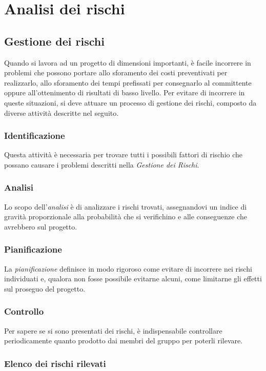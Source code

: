 \section{Analisi dei rischi}
	\subsection{Gestione dei rischi}
Quando si lavora ad un progetto di dimensioni importanti, è facile incorrere in problemi che possono portare allo sforamento dei costi preventivati per realizzarlo, allo sforamento dei tempi prefissati per consegnarlo al committente oppure all'ottenimento di risultati di basso livello. \newline
Per evitare di incorrere in queste situazioni, si deve attuare un processo di gestione dei rischi, composto da diverse attività descritte nel seguito.

	\subsubsection{Identificazione}
Questa attività è necessaria per trovare tutti i possibili fattori di rischio che possano causare i problemi descritti nella \textit{Gestione dei Rischi}.

	\subsubsection{Analisi}
	 Lo scopo dell'\textit{analisi} è di analizzare i rischi trovati, assegnandovi un indice di gravità proporzionale alla probabilità che si verifichino e alle conseguenze che avrebbero sul progetto.

	\subsubsection{Pianificazione}
La \textit{pianificazione} definisce in modo rigoroso come evitare di incorrere nei rischi individuati e, qualora non fosse possibile evitarne alcuni, come limitarne gli effetti sul proseguo del progetto.

	\subsubsection{Controllo} 
 Per sapere se si sono presentati dei rischi, è indispensabile controllare periodicamente quanto prodotto dai membri del gruppo per poterli rilevare.

	\newpage
		
\subsubsection{Elenco dei rischi rilevati}

